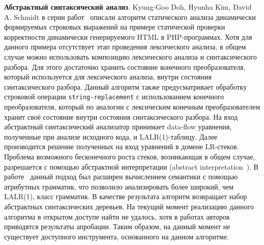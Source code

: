 \textbf{Абстрактный синтаксический анализ}. Kyung-Goo Doh,  Hyunha Kim, David A. Schmidt в серии работ~\cite{LrAbstract1, LrAbstract2, LRAbstractParsingSema} описали алгоритм статического анализа динамически формируемых строковых выражений на примере статической проверки корректности динамически генерируемого HTML в PHP-программах. Хотя для данного примера отсутствует этап проведения лексического анализа, в общем случае можно использовать композицию лексического анализа и синтаксического разбора. Для этого достаточно хранить состояние конечного преобразователя, который используется для лексического анализа, внутри состояния синтаксического разбора. Данный алгоритм также предусматривает обработку строковой операции \verb|string-replacement| с использованием конечного преобразователя, который по аналогии с лексическим конечным преобразователем хранит своё состояние внутри состояния синтаксического разбора. На вход абстрактный синтаксический анализатор принимает data-flow  уравнения, полученные при анализе исходного кода, и  LALR(1)-таблицу. Далее производится решение полученных на вход уравнений в домене LR-стеков.  Проблема возможного бесконечного роста стеков, возникающая в общем случае, разрешается с помощью абстрактной интерпретации (abstract interpretation~\cite{AbstractInterpretation}). В работе~\cite{LRAbstractParsingSema} данный подход был расширен вычислением семантики с помощью атрибутных грамматик, что позволило анализировать более широкий, чем LALR(1), класс грамматик. В качестве результата алгоритм возвращает набор абстрактных синтаксических деревьев. На текущий момент реализацию данного алгоритма в открытом доступе найти не удалось, хотя в работах авторов приводятся результаты апробации. Таким образом, на данный момент не существует доступного инструмента, основанного на данном алгоритме.

